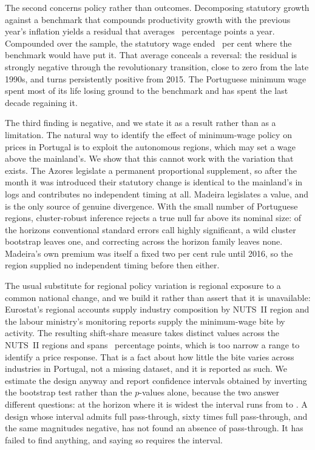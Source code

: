 The second concerns policy rather than outcomes. Decomposing statutory growth
against a benchmark that compounds productivity growth with the previous year's
inflation yields a residual that averages \MeanResidualPct{}~percentage points a year.
Compounded over the sample, the statutory wage ended
\CumulativeGapMagnitudePct{}~per cent \CumulativeGapDirection{} where the
benchmark would have put it. That average conceals a
reversal: the residual is strongly negative through the revolutionary
transition, close to zero from the late 1990s, and turns persistently positive
from 2015. The Portuguese minimum wage spent most of its life losing ground to
the benchmark and has spent the last decade regaining it.

The third finding is negative, and we state it as a result rather than as a
limitation. The natural way to identify the effect of minimum-wage policy on
prices in Portugal is to exploit the autonomous regions, which may set a wage
above the mainland's. We show that this cannot work with the variation that
exists. The Azores legislate a permanent proportional supplement, so after the
month it was introduced their statutory change is identical to the mainland's in
logs and contributes no independent timing at all. Madeira legislates a value,
and is the only source of genuine divergence. With the small number of
Portuguese regions, cluster-robust inference rejects a true null far above its
nominal size: of the horizons conventional standard errors call highly
significant, a wild cluster bootstrap leaves one, and correcting across the
horizon family leaves none. Madeira's own premium was itself a fixed two per
cent rule until 2016, so the region supplied no independent timing before then
either.

The usual substitute for regional policy variation is regional exposure to a
common national change, and we build it rather than assert that it is
unavailable: Eurostat's regional accounts supply industry composition by
NUTS~II region and the labour ministry's monitoring reports supply the
minimum-wage bite by activity. The resulting shift-share measure takes
\ExposureDistinctValues{} distinct values across the \ExposureRegions{} NUTS~II
regions and spans
\ExposureSpreadPP{}~percentage points, which is too narrow a range to identify
a price response. That is a fact about how little the bite varies across
industries in Portugal, not a missing dataset, and it is reported as such. We
estimate the design anyway and report confidence intervals obtained by
inverting the bootstrap test rather than the $p$-values alone, because the two
answer different questions: at the horizon where it is widest the interval runs
from \ExposureWidestIntervalLower{} to \ExposureWidestIntervalUpper{}. A design
whose interval admits full pass-through, sixty times full pass-through, and the
same magnitudes negative, has not found an absence of pass-through. It has
failed to find anything, and saying so requires the interval.

